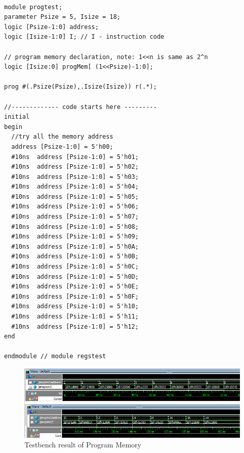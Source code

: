 \begin{lstlisting}

module progtest;
parameter Psize = 5, Isize = 18;
logic [Psize-1:0] address;
logic [Isize-1:0] I; // I - instruction code

// program memory declaration, note: 1<<n is same as 2^n
logic [Isize:0] progMem[ (1<<Psize)-1:0];

prog #(.Psize(Psize),.Isize(Isize)) r(.*);

//------------- code starts here ---------
initial
begin
  //try all the memory address
  address [Psize-1:0] = 5'h00;
  #10ns  address [Psize-1:0] = 5'h01; 
  #10ns  address [Psize-1:0] = 5'h02;
  #10ns  address [Psize-1:0] = 5'h03;
  #10ns  address [Psize-1:0] = 5'h04;
  #10ns  address [Psize-1:0] = 5'h05;
  #10ns  address [Psize-1:0] = 5'h06;
  #10ns  address [Psize-1:0] = 5'h07;
  #10ns  address [Psize-1:0] = 5'h08;
  #10ns  address [Psize-1:0] = 5'h09;
  #10ns  address [Psize-1:0] = 5'h0A;
  #10ns  address [Psize-1:0] = 5'h0B;
  #10ns  address [Psize-1:0] = 5'h0C;
  #10ns  address [Psize-1:0] = 5'h0D;
  #10ns  address [Psize-1:0] = 5'h0E; 
  #10ns  address [Psize-1:0] = 5'h0F; 
  #10ns  address [Psize-1:0] = 5'h10; 
  #10ns  address [Psize-1:0] = 5'h11;
  #10ns  address [Psize-1:0] = 5'h12;              
end

endmodule // module regstest
\end{lstlisting}

\begin{figure}[H]
		\centering
		\includegraphics[width = \textwidth]{Figures/PM}		
		\caption[Additional Notes]{Testbench result of Program Memory}
		\label {fig:pm}
\end{figure}

